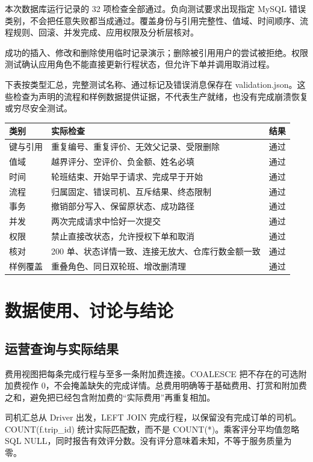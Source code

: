 \documentclass[11pt,a4paper]{article}
\begin{document}
本次数据库运行记录的 32 项检查全部通过。负向测试要求出现指定 MySQL 错误类别，不会把任意失败都当成通过。覆盖身份与引用完整性、值域、时间顺序、流程规则、回滚、并发完成、应用权限及分析层核对。

成功的插入、修改和删除使用临时记录演示；删除被引用用户的尝试被拒绝。权限测试确认应用角色不能直接更新行程状态，但允许下单并调用取消过程。

下表按类型汇总，完整测试名称、通过标记及错误消息保存在 validation.json。这些检查为声明的流程和样例数据提供证据，不代表生产就绪，也没有完成崩溃恢复或穷尽安全测试。

\par\begingroup\small\noindent
\begin{tabularx}{\linewidth}{p{2.5cm}Yp{1.5cm}}
\toprule
类别 & 实际检查 & 结果\\\midrule
键与引用 & 重复编号、重复评价、无效父记录、受限删除 & 通过\\
值域 & 越界评分、空评价、负金额、姓名必填 & 通过\\
时间 & 轮班结束、开始早于请求、完成早于开始 & 通过\\
流程 & 归属固定、错误司机、互斥结果、终态限制 & 通过\\
事务 & 撤销部分写入、保留原状态、成功路径 & 通过\\
并发 & 两次完成请求中恰好一次提交 & 通过\\
权限 & 禁止直接改状态，允许授权下单和取消 & 通过\\
核对 & 200 单、状态详情一致、连接无放大、仓库行数金额一致 & 通过\\
样例覆盖 & 重叠角色、同日双轮班、增改删清理 & 通过\\
\bottomrule
\end{tabularx}
\par\endgroup

\clearpage
\section{数据使用、讨论与结论}
\subsection{运营查询与实际结果}
费用视图把每条完成行程与至多一条附加费连接。COALESCE 把不存在的可选附加费视作 0，不会掩盖缺失的完成详情。总费用明确等于基础费用、打赏和附加费之和，避免把已经包含附加费的“实际费用”再重复相加。

司机汇总从 Driver 出发，LEFT JOIN 完成行程，以保留没有完成订单的司机。COUNT(f.trip\_\allowbreak{}id) 统计实际匹配数，而不是 COUNT(*)。乘客评分平均值忽略 SQL NULL，同时报告有效评分数。没有评分意味着未知，不等于服务质量为零。
\end{document}
